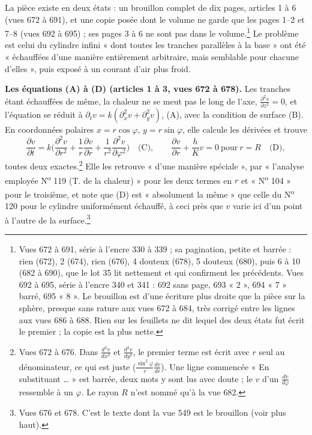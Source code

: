 \documentclass[11pt,a4paper]{article}
\begin{document}
La pièce existe en deux états : un brouillon complet de dix pages, articles 1
à 6 (vues 672 à 691), et une copie posée dont le volume ne garde que les pages
1--2 et 7--8 (vues 692 à 695) ; ses pages 3 à 6 ne sont pas dans le
volume.\footnote{Vues 672 à 691, série à l'encre 330 à 339 ; sa pagination,
petite et barrée : rien (672), 2 (674), rien (676), 4 douteux (678), 5 douteux
(680), puis 6 à 10 (682 à 690), que le lot 35 lit nettement et qui confirment
les précédents. Vues 692 à 695, série à l'encre 340 et 341 : 692 sans page,
693 « 2 », 694 « 7 » barré, 695 « 8 ». Le brouillon est d'une écriture plus
droite que la pièce sur la sphère, presque sans rature aux vues 672 à 684, très
corrigé entre les lignes aux vues 686 à 688. Rien sur les feuillets ne dit
lequel des deux états fut écrit le premier ; la copie est la plus nette.} Le
problème est celui du cylindre infini « dont toutes les tranches parallèles à
la base » ont été « échauffées d'une manière entièrement arbitraire, mais
semblable pour chacune d'elles », puis exposé à un courant d'air plus froid.

\textbf{Les équations (A) à (D) (articles 1 à 3, vues 672 à 678).} Les tranches
étant échauffées de même, la chaleur ne se meut pas le long de l'axe,
$\frac{\partial^2 v}{\partial z^2} = 0$, et l'équation se réduit à
$\partial_t v = k(\partial_x^2 v + \partial_y^2 v)$, (A), avec la condition de
surface (B). En coordonnées polaires $x = r\cos\varphi$, $y = r\sin\varphi$,
elle calcule les dérivées et trouve
\[
\frac{\partial v}{\partial t} = k\Big(\frac{\partial^2 v}{\partial r^2} +
\frac1r\frac{\partial v}{\partial r} + \frac{1}{r^2}\frac{\partial^2
v}{\partial\varphi^2}\Big) \quad \text{(C)}, \qquad \frac{\partial v}{\partial
r} + \frac hK v = 0 \ \text{pour}\ r = R \quad \text{(D)},
\]
toutes deux exactes.\footnote{Vues 672 à 676. Dans $\frac{d^2v}{dx^2}$ et
$\frac{d^2v}{dy^2}$, le premier terme est écrit avec $r$ seul au dénominateur,
ce qui est juste ($\frac{\sin^2\varphi}{r}\frac{dv}{dr}$). Une ligne
commencée « En substituant … » est barrée, deux mots y sont lus avec doute ; le
$v$ d'un $\frac{dv}{d\varphi}$ ressemble à un $\varphi$. Le rayon $R$ n'est nommé
qu'à la vue 682.} Elle les retrouve « d'une manière spéciale », par
« l'analyse employée N\textsuperscript{o} 119 (T. de la chaleur) » pour les
deux termes en $r$ et « N\textsuperscript{o} 104 » pour le troisième, et note
que (D) est « absolument la même » que celle du N\textsuperscript{o} 120 pour le
cylindre uniformément échauffé, à ceci près que $v$ varie ici d'un point à
l'autre de la surface.\footnote{Vues 676 et 678. C'est le texte dont la vue 549
est le brouillon (voir plus haut).}
\end{document}
